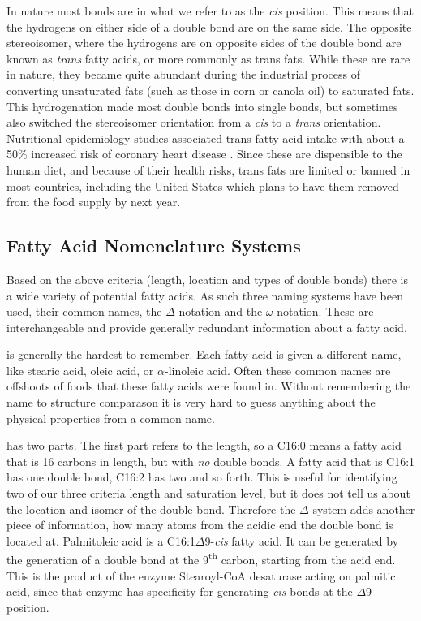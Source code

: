 \documentclass{tufte-handout}
\begin{document}
  In nature most bonds are in what we refer to as the \textit{cis} position.  This means that the hydrogens on either side of a double bond are on the same side.  The opposite stereoisomer, where the hydrogens are on opposite sides of the double bond are known as \textit{trans} fatty acids, or more commonly as trans fats.  While these are rare in nature, they became quite abundant during the industrial process of converting unsaturated fats (such as those in corn or canola oil) to saturated fats.  This hydrogenation made most double bonds into single bonds, but sometimes also switched the stereoisomer orientation from a \textit{cis} to a \textit{trans} orientation.  Nutritional epidemiology studies associated trans fatty acid intake with about a 50\% increased risk of coronary heart disease \citep{Willett1993}.  Since these are dispensible to the human diet, and because of their health risks, trans fats are limited or banned in most countries, including the United States which plans to have them removed from the food supply by next year.  

\subsection{Fatty Acid Nomenclature Systems}

Based on the above criteria (length, location and types of double bonds) there is a wide variety of potential fatty acids.  As such three naming systems have been used, their common names, the $\Delta$ notation and the $\omega$ notation.  These are interchangeable and provide generally redundant information about a fatty acid.

 is generally the hardest to remember.  Each fatty acid is given a different name, like stearic acid, oleic acid, or $\alpha$-linoleic acid.  Often these common names are offshoots of foods that these fatty acids were found in.  Without remembering the name to structure comparason it is very hard to guess anything about the physical properties from a common name.

 has two parts.  The first part refers to the length, so a C16:0 means a fatty acid that is 16 carbons in length, but with \emph{no} double bonds.  A fatty acid that is C16:1 has one double bond, C16:2 has two and so forth.  This is useful for identifying two of our three criteria length and saturation level, but it does not tell us about the location and isomer of the double bond.  Therefore the $\Delta$ system adds another piece of information, how many atoms from the acidic end the double bond is located at.  Palmitoleic acid is a C16:1$\Delta$9-\textit{cis} fatty acid.  It can be generated by the generation of a double bond at the 9\textsuperscript{th} carbon, starting from the acid end.  This is the product of the enzyme Stearoyl-CoA desaturase acting on palmitic acid, since that enzyme has specificity for generating \textit{cis} bonds at the $\Delta$9 position.
\end{document}
